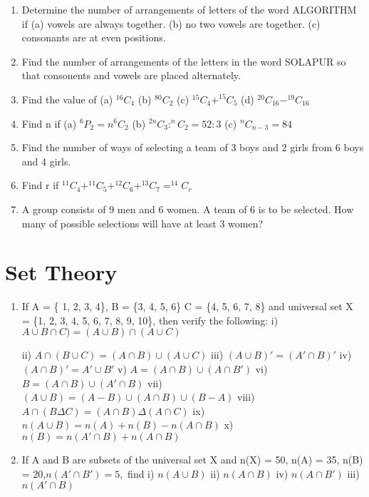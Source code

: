 \documentclass[14pt]{article}
\begin{document}
\begin{multicols}{2}
\begin{enumerate}[resume]
\item Determine the number of arrangements of
letters of the word ALGORITHM if
(a) vowels are always together.
(b) no two vowels are together.
(c) consonants are at even positions.

\item Find the number of arrangements of the letters
in the word SOLAPUR so that consonents
and vowels are placed alternately.

\item Find the value of  (a) $ ^{16}C_4 $
(b)  $ ^{80}C_2$
(c)  $ ^{15}C_4 + ^{15}C_5 $
(d)  $ ^{20}C_{16} - ^{19}C_{16} $

\item Find n if  (a) $ ^6P_2 = n ^6C_2 $
(b)  $ ^{2n}C_3 : ^nC_2 = 52:3$
(c)  $ ^nC_{n-3}=84$

\item Find the number of ways of selecting a team
of 3 boys and 2 girls from 6 boys and 4 girls.

\item Find r if  $ ^{11}C_4 + ^{11}C_5 + ^{12}C_6 +  ^{13}C_7=^{14}C_r$
 
 \item A group consists of 9 men and 6 women.
A team of 6 is to be selected. How many
of possible selections will have at least
3 women?
\end{enumerate} 


\section{Set Theory}
\noindent
\begin{enumerate}[resume]

\item  If A = \{ 1, 2, 3, 4\}, B = \{3, 4, 5, 6\}
		  C = \{4, 5, 6, 7, 8\} and universal set  X = \{1, 2, 3, 4, 5, 6, 7, 8, 9, 10\}, then verify
the following:
i)		$ A \cup B\cap C) = (A\cup B) \cap (A \cup C)$

ii)	$A\cap (B\cup C)=(A\cap B)\cup (A \cup C)$
iii) $(A\cup B)' = (A'\cap B)'         $
iv)	$ (A\cap B)' = A'\cup B'          $
v)	$	 A = (A\cap B)\cup (A\cap B') $
vi)	$	 B = (A\cap B)\cup (A'\cap B) $
vii) $(A\cup B)=(A-B)\cup (A\cap B)\cup (B-A)$
viii)	$A \cap (B\Delta C) = (A\cap B) \Delta (A\cap C)$
ix) $n (A\cup B) = n(A) + n(B) - n(A\cap B)$ 
x) $n (B) = n(A'\cap B) + n(A\cap B)$

\item If A and B are subsets of the universal set X and n(X) = 50, n(A) = 35, n(B) = 20,$ n(A'\cap B') = 5,$ find i) $n (A\cup B)$ ii) $n(A\cap B)$
iv) $ n(A\cap B')$
iii) $ n(A'\cap B) $


\end{enumerate}
\end{multicols}
\end{document}
